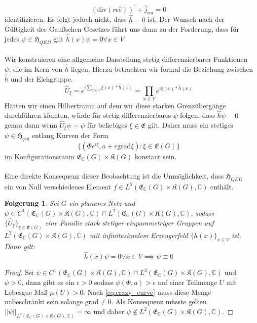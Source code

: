 \documentclass[11pt,a4paper,leqno]{report}
\newtheorem{corollary}[theorem]{Folgerung}
\numberwithin{equation}{chapter}
\begin{document}
\begin{equation}
(\text{div}(r\epsilon \hat{e}))^\prime + \hat{j}_{\text{em}}=0
\end{equation} identifizieren.  Es folgt jedoch nicht, dass $\hat{h}=0$ ist. Der Wunsch nach der G\"ultigkeit des Gau\ss{}schen Gesetzes f\"uhrt uns dann zu der Forderung, dass f\"ur jedes $\psi\in\mathfrak{H}_{QED}$ gilt $\hat{h}(x)\psi = 0\forall x\in V$\\
\\
Wir konstruieren eine allgemeine Darstellung stetig differenzierbarer Funktionen $\psi$, die im Kern von $\hat{h}$ liegen. Hierzu betrachten wir formal die Beziehung zwischen $\hat{h}$ und der Eichgruppe.
\begin{equation}
	\hat{U}_\xi = e^{i\sum_{x\in V}\xi(x)*\hat{h}(x)} = \prod_{x\in V}e^{i\xi(x)*\hat{h}(x)}
\end{equation}
Hätten wir einen Hilbertraum auf dem wir diese starken Grenzübergänge durchführen könnten, würde für stetig differenzierbares $\psi$ folgen, dass $\hat{h}\psi=0$ genau dann wenn $\hat{U}_\xi\psi = \psi$ f\"ur beliebiges $\xi\in\mathfrak{E}$ gilt. Daher muss ein stetiges $\psi\in \mathfrak{H}_{qed}$ entlang Kurven der Form
\begin{equation}
	\{(\Phi e^{i\xi}, a + r \text{grad}\xi): \xi\in\mathfrak{E}(G)\}\label{eq:crazy_curve}
\end{equation} 
im Konfigurationsraum $\mathfrak{E}_\mathbb{C}(G)\times\mathfrak{K}(G)$ konstant sein.\\
\\
Eine direkte Konsequenz dieser Beobachtung ist die Unm\"oglichkeit, dass $\mathfrak{H}_{QED}$ ein von Null verschiedenes Element $f\in L^2(\mathfrak{E}_\mathbb{C}(G)\times\mathfrak{K}(G), \mathbb{C})$ enth\"alt.
\begin{corollary}\label{cor:ker_h_trivial}
	Sei $G$ ein planares Netz und $\psi\in C^1(\mathfrak{E}_\mathbb{C}(G)\times\mathfrak{K}(G),\mathbb{C})\cap L^2(\mathfrak{E}_\mathbb{C}(G)\times\mathfrak{K}(G),\mathbb{C})$, sodass $\{\hat{U}_\xi\}_{\xi\in\mathfrak{E}(G)}$ eine Familie stark stetiger einparametriger Gruppen auf $L^2(\mathfrak{E}_\mathbb{C}(G)\times\mathfrak{K}(G),\mathbb{C})$ mit infinitesimalem Erzeugerfeld $\{\hat{h}(x)\}_{x\in V}$ ist. Dann gilt:
\[\hat{h}(x)\psi=0 \forall x\in V \implies \psi\equiv 0\]
\end{corollary}
\begin{proof}
	Sei $\psi\in C^1(\mathfrak{E}_\mathbb{C}(G)\times\mathfrak{K}(G), \mathbb{C})\cap L^2(\mathfrak{E}_\mathbb{C}(G)\times\mathfrak{K}(G), \mathbb{C})$ und $\psi>0$, dann gibt es ein $\epsilon>0$ sodass $\psi(\Phi, a)>\epsilon$ auf einer Teilmenge $U$ mit Lebesgue Ma\ss{} $\mu(U)>0$. Nach \eqref{eq:crazy_curve} muss diese Menge unbeschr\"ankt sein solange $\text{grad}\neq 0$. Als Konsequenz m\"usste gelten $||\psi||_{L^2(\mathfrak{E}_\mathbb{C}(G)\times\mathfrak{K}(G), \mathbb{C})}=\infty$ und daher $\psi \notin L^2(\mathfrak{E}_\mathbb{C}(G)\times\mathfrak{K}(G), \mathbb{C})$.
\end{proof}
\end{document}
